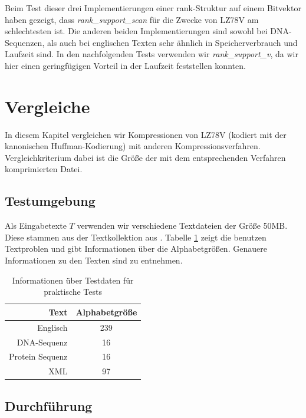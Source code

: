 \documentclass[a4paper,11pt]{scrartcl}%
\theoremstyle{change}
\theoremstyle{nonumberplain}
\theoremstyle{change}
\theoremstyle{nonumberplain}
\theoremstyle{change}
\theoremstyle{nonumberplain}
\begin{document}
Beim Test dieser drei Implementierungen einer rank-Struktur auf einem Bitvektor haben gezeigt, dass \textit{rank\_support\_scan} für die Zwecke von LZ78V am schlechtesten ist. Die anderen beiden Implementierungen sind sowohl bei DNA-Sequenzen, als auch bei englischen Texten sehr ähnlich in Speicherverbrauch und Laufzeit sind. In den nachfolgenden Tests verwenden wir \textit{rank\_support\_v}, da wir hier einen geringfügigen Vorteil in der Laufzeit feststellen konnten.
\newpage

\section{Vergleiche}

In diesem Kapitel vergleichen wir Kompressionen von LZ78V (kodiert mit der kanonischen Huffman-Kodierung) mit anderen Kompressionsverfahren.
Vergleichkriterium dabei ist die Größe der mit dem entsprechenden Verfahren komprimierten Datei.

\subsection{Testumgebung}

Als Eingabetexte $T$ verwenden wir verschiedene Textdateien der Größe 50MB. Diese stammen aus der Textkollektion aus \cite{pizza}. Tabelle \ref{tbl:test_texts} zeigt die benutzen Textproblen und gibt Informationen über die Alphabetgrößen. Genauere Informationen zu den Texten sind \cite{pizza} zu entnehmen.

\begin{table}[h] 
	\begin{center}
		\begin{tabular}{|r|c|}\hline
			Text & Alphabetgröße  \\ \hline \hline
			Englisch & 239 \\ \hline
			DNA-Sequenz & 16 \\ \hline
			Protein Sequenz & 16 \\ \hline
			XML & 97 \\ \hline
		\end{tabular}
		\caption{Informationen über Testdaten für praktische Tests}
		\label{tbl:test_texts}
	\end{center}
\end{table}

\subsection{Durchführung}\label{vergleich_durch}
\end{document}
